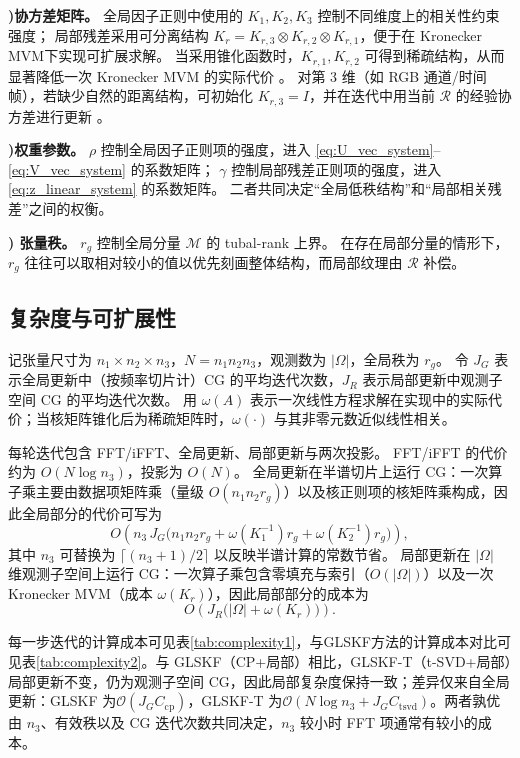 \documentclass[UTF8]{ctexart}
\begin{document}
\textbf{)协方差矩阵。}
全局因子正则中使用的 $K_1,K_2,K_3$ 控制不同维度上的相关性约束强度；
局部残差采用可分离结构 $K_r=K_{r,3}\otimes K_{r,2}\otimes K_{r,1}$，便于在 Kronecker MVM下实现可扩展求解。
当采用锥化函数时，$K_{r,1},K_{r,2}$ 可得到稀疏结构，从而显著降低一次 Kronecker MVM 的实际代价 \cite{gneiting2002compact,furrer2006tapering}。
对第 $3$ 维（如 RGB 通道/时间帧），若缺少自然的距离结构，可初始化 $K_{r,3}=I$，并在迭代中用当前 $\mathcal{R}$ 的经验协方差进行更新 \cite{lei2024glskf}。

\textbf{)权重参数。 }
$\rho$ 控制全局因子正则项的强度，进入 \eqref{eq:U_vec_system}--\eqref{eq:V_vec_system} 的系数矩阵；
$\gamma$ 控制局部残差正则项的强度，进入 \eqref{eq:z_linear_system} 的系数矩阵。
二者共同决定“全局低秩结构”和“局部相关残差”之间的权衡。

\textbf{) 张量秩。}
$r_g$ 控制全局分量 $\mathcal{M}$ 的 tubal-rank 上界。
在存在局部分量的情形下，$r_g$ 往往可以取相对较小的值以优先刻画整体结构，而局部纹理由 $\mathcal{R}$ 补偿。



\subsection{复杂度与可扩展性}
\label{sec:complexity}

记张量尺寸为 $n_1\times n_2\times n_3$，$N=n_1n_2n_3$，观测数为 $|\Omega|$，全局秩为 $r_g$。
令 $J_G$ 表示全局更新中（按频率切片计）CG 的平均迭代次数，$J_R$ 表示局部更新中观测子空间 CG 的平均迭代次数。
用 $\omega(A)$ 表示一次线性方程求解在实现中的实际代价；当核矩阵锥化后为稀疏矩阵时，$\omega(\cdot)$ 与其非零元数近似线性相关。

每轮迭代包含 FFT/iFFT、全局更新、局部更新与两次投影。
FFT/iFFT 的代价约为 $O(N\log n_3)$，投影为 $O(N)$。
全局更新在半谱切片上运行 CG：一次算子乘主要由数据项矩阵乘（量级 $O(n_1n_2r_g)$）以及核正则项的核矩阵乘构成，因此全局部分的代价可写为
\[
O\!\left(n_3\,J_G\Big(n_1n_2r_g+\omega(K_1^{-1})r_g+\omega(K_2^{-1})r_g\Big)\right),
\]
其中 $n_3$ 可替换为 $\lceil(n_3+1)/2\rceil$ 以反映半谱计算的常数节省。
局部更新在 $|\Omega|$ 维观测子空间上运行 CG：一次算子乘包含零填充与索引（$O(|\Omega|)$）以及一次 Kronecker MVM（成本 $\omega(K_r)$），因此局部部分的成本为
\[
O\!\left(J_R\big(|\Omega|+\omega(K_r)\big)\right).
\]

每一步迭代的计算成本可见表\eqref{tab:complexity1}，与GLSKF方法的计算成本对比可见表\eqref{tab:complexity2}。与 GLSKF（CP+局部）相比，GLSKF-T（t-SVD+局部）局部更新不变，仍为观测子空间 CG，因此局部复杂度保持一致；差异仅来自全局更新：GLSKF 为$ \mathcal{O}(J_GC_{\mathrm{cp}})$，GLSKF-T 为$\mathcal{O}(N\log n_3 + J_GC_{\mathrm{tsvd}})$。两者孰优由 $n_3$、有效秩以及 CG 迭代次数共同决定，$n_3$ 较小时 FFT 项通常有较小的成本。 
\end{document}
